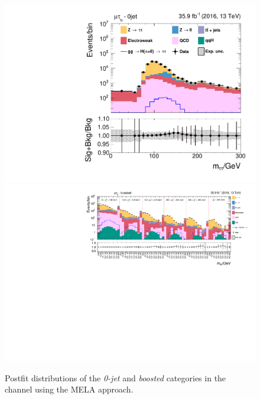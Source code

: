 \begin{figure}[h!]
    \centering
        \includegraphics[width=.5\textwidth]{Figures/statana/Postfit_JEC_mela3D/postfit_fit_s_htt_mt_1_13TeV.pdf}\\
        \includegraphics[width=\textwidth]{Figures/statana/Postfit_JEC_mela3D/postfit_fit_s_htt_mt_2_13TeV.pdf}    
    \caption{Postfit distributions of the \textit{0-jet} and \textit{boosted} categories in the \mutau{} channel  using the MELA approach.}
\end{figure}
